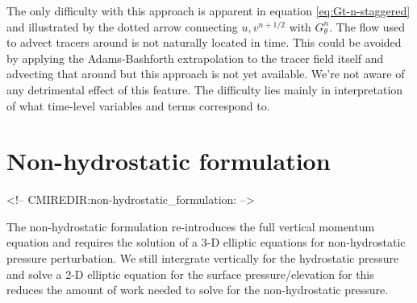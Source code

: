 The only difficulty with this approach is apparent in equation
\ref{eq:Gt-n-staggered} and illustrated by the dotted arrow
connecting $u,v^{n+1/2}$ with $G_\theta^{n}$. The flow used to advect
tracers around is not naturally located in time. This could be avoided
by applying the Adams-Bashforth extrapolation to the tracer field
itself and advecting that around but this approach is not yet
available. We're not aware of any detrimental effect of this
feature. The difficulty lies mainly in interpretation of what
time-level variables and terms correspond to.


\section{Non-hydrostatic formulation}
\label{sec:non-hydrostatic}
\begin{rawhtml}
<!-- CMIREDIR:non-hydrostatic_formulation: -->
\end{rawhtml}

The non-hydrostatic formulation re-introduces the full vertical
momentum equation and requires the solution of a 3-D elliptic
equations for non-hydrostatic pressure perturbation. We still
intergrate vertically for the hydrostatic pressure and solve a 2-D
elliptic equation for the surface pressure/elevation for this reduces
the amount of work needed to solve for the non-hydrostatic pressure.

